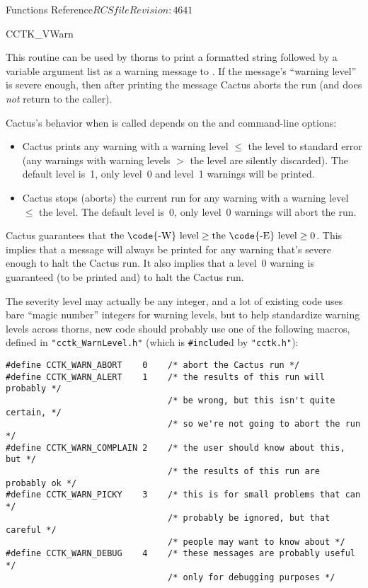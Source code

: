 \begin{cactuspart}{ Functions Reference}{$RCSfile$}{$Revision: 4641 $}
\begin{FunctionDescription}{CCTK\_VWarn}
\begin{Discussion}
This routine can be used by thorns to print a formatted string followed
by a variable argument list as a warning message to .  If
the message's ``warning level'' is severe enough, then after printing
the message Cactus aborts the run (and  does {\em not\/}
return to the caller).

Cactus's behavior when  is called depends on the
 and  command-line options:
\begin{itemize}
\item   Cactus prints any warning with a warning level $\le$
        the  level to standard error (any warnings with
        warning levels $>$ the  level are silently discarded).
        The default  level is~1, \ie{} only level~0 and level~1
        warnings will be printed.
\item   Cactus stops (aborts) the current run for any warning
        with a warning level $\le$ the  level.
        The default  level is~0, \ie{} only level~0
        warnings will abort the run.
\end{itemize}

Cactus guarantees that
$\hbox{the \code{-W}~level} \ge \hbox{the \code{-E}~level} \ge 0$.
This implies that a message will always be printed for any warning that's
severe enough to halt the Cactus run.  It also implies that a level~0
warning is guaranteed (to be printed and) to halt the Cactus run.

The severity level may actually be any integer, and a lot of existing
code uses bare ``magic number'' integers for warning levels, but to
help standardize warning levels across thorns, new code should probably
use one of the following macros, defined in \verb|"cctk_WarnLevel.h"|
(which is \verb|#include|d by \verb|"cctk.h"|):
\begin{verbatim}
#define CCTK_WARN_ABORT    0    /* abort the Cactus run */
#define CCTK_WARN_ALERT    1    /* the results of this run will probably */
                                /* be wrong, but this isn't quite certain, */
                                /* so we're not going to abort the run */
#define CCTK_WARN_COMPLAIN 2    /* the user should know about this, but */
                                /* the results of this run are probably ok */
#define CCTK_WARN_PICKY    3    /* this is for small problems that can */
                                /* probably be ignored, but that careful */
                                /* people may want to know about */
#define CCTK_WARN_DEBUG    4    /* these messages are probably useful */
                                /* only for debugging purposes */
\end{verbatim}


\end{Discussion}
\end{FunctionDescription}
\end{cactuspart}
